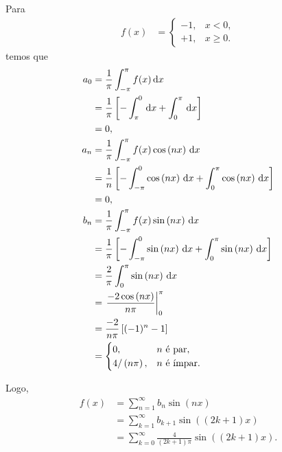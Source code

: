 \begin{exem}
    Para
    \begin{align*}
        f(x) &= \begin{cases}
            -1, & x < 0, \\
            +1, & x \geq 0.
        \end{cases}
    \end{align*}
    temos que
    \begin{align*}
        a_0 &= \frac{1}{\pi} \int_{-\pi}^\pi f(x) \, \mathrm{d}x \\
        &= \frac{1}{\pi} \left[ -\int_\pi^0 \, \mathrm{d}x + \int_0^\pi \, \mathrm{d}x \right] \\
        &= 0, \\
        a_n &= \frac{1}{\pi} \int_{-\pi}^\pi f(x) \cos\left( n x \right) \, \mathrm{d}x \\
        &= \frac{1}{n} \left[ -\int_{-\pi}^0 \cos\left( n x \right) \, \mathrm{d}x + \int_0^\pi \cos\left( n x \right) \, \mathrm{d}x \right] \\
        &= 0, \\
        b_n &= \frac{1}{\pi} \int_{-\pi}^\pi f(x) \sin\left( n x \right) \, \mathrm{d}x \\
        &= \frac{1}{\pi} \left[ -\int_{-\pi}^0 \sin\left( n x \right) \, \mathrm{d}x + \int_0^\pi \sin\left( n x \right) \, \mathrm{d}x \right] \\
        &= \frac{2}{\pi} \int_0^\pi \sin\left( n x \right) \, \mathrm{d}x \\
        &= \left. \frac{-2 \cos\left( n x \right)}{n \pi} \right|_0^\pi \\
        &= \frac{-2}{n \pi} \left[ (-1)^n - 1 \right] \\
        &= \begin{cases}
            0, & n \text{ \'{e} par}, \\
            4 / \left( n \pi \right), & n \text{ \'{e} \'{i}mpar}.
        \end{cases}
    \end{align*}

    Logo,
    \begin{align*}
        f(x) &= \sum_{n = 1}^\infty b_n \sin\left( n x \right) \\
        &= \sum_{k = 1}^\infty b_{k + 1} \sin\left( (2k + 1) x \right) \\
        &= \sum_{k = 0}^\infty \frac{4}{\left( 2k + 1 \right) \pi} \sin\left( (2k + 1) x \right).
    \end{align*}
\end{exem}

